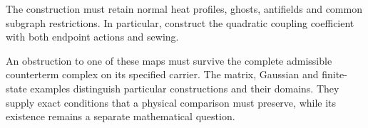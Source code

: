 \begin{problem}
\begin{enumerate}
The construction must retain normal heat profiles, ghosts,
antifields and common subgraph restrictions.
In particular, construct the quadratic coupling coefficient
with both endpoint actions and sewing.
\end{enumerate}
\end{problem}

An obstruction to one of these maps must survive the complete
admissible counterterm complex on its specified carrier.
The matrix, Gaussian and finite-state examples distinguish
particular constructions and their domains.
They supply exact conditions that a physical comparison must
preserve, while its existence remains a separate mathematical
question.
